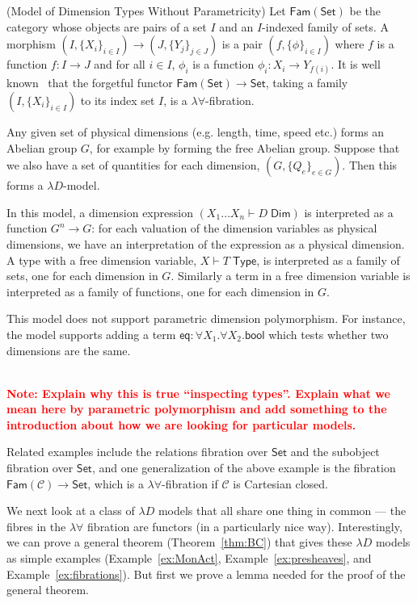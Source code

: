 \documentclass[a4paper,UKenglish]{lipics}
\newcommand\note[1]{{ \bf \textcolor{red} {\vspace{2mm}\; \\ Note: #1\\}}}
\newcommand{\msf}[1]{\mathsf{#1}} %
\newcommand{\Set}{\msf{Set}}
\newcommand{\Fam}[1]{\msf{Fam}(#1)}
\newcommand{\C}{\mathcal{C}}
\newcommand{\bool}{\msf{bool}}
\newcommand{\Tj}[2]{#1 \vdash #2 \; \msf{ Type}}
\newcommand{\Dj}[2]{#1 \vdash #2 \; \msf{ Dim}}
\newcommand{\Dim}{D}
\newcommand{\Dvar}{X}
\begin{document}
\begin{example}(Model of Dimension Types Without Parametricity)
\label{example:famset}
Let $\Fam\Set$ be the category whose objects are pairs of a set $I$ and an $I$-indexed family of sets. A morphism $(I,\{X_i\}_{i\in I})\to (J,\{Y_j\}_{j\in J})$ is a pair $(f,\{\phi\}_{i\in I})$ where $f$ is a function $f:I\to J$ and for all $i\in I$, $\phi_i$ is a function $\phi_i:X_i\to Y_{f(i)}$. It is well known~\cite{} that the forgetful functor $\Fam\Set\to \Set$, taking a family $(I,\{X_i\}_{i\in I})$ to its index set $I$, is a $\lambda\forall$-fibration.

Any given set of physical dimensions (e.g. length, time, speed etc.) forms an Abelian group $G$, for example by forming the free Abelian group. Suppose that we also have a set of quantities for each dimension, $(G,\{Q_e\}_{e\in G})$. Then this forms a $\lambda D$-model.

In this model, a dimension expression $(\Dj{\Dvar_1\dots \Dvar_n} \Dim)$ is interpreted as a function $G^n\to G$: for each valuation of the dimension variables as physical dimensions, we have an interpretation of the expression as a physical dimension. A type with a free dimension variable, $\Tj \Dvar T$, is interpreted as a family of sets, one for each dimension in $G$. Similarly a term in a free dimension variable is interpreted as a family of functions, one for each dimension in $G$.

This model does not support parametric dimension polymorphism. For instance, the model supports adding a term $\mathsf{eq}:\forall \Dvar_1.\forall \Dvar_2.\bool$ which tests whether two dimensions are the same.

\note{Explain why this is true ``inspecting types''. Explain what we mean here by parametric polymorphism and add something to the introduction about how we are looking for particular models.}
\end{example}

Related examples include the relations fibration over $\Set$ and the subobject fibration over $\Set$, and one generalization of the above example is the fibration $\Fam{\C}\to\Set$, which is a $\lambda\forall$-fibration if $\C$ is Cartesian closed.

We next look at a class of $\lambda D$ models that all share one thing in common --- the fibres in the $\lambda \forall$ fibration are functors (in a particularly nice way). Interestingly, we can prove a general theorem (Theorem~\ref{thm:BC}) that gives these $\lambda D$ models as simple examples (Example~\ref{ex:MonAct}, Example~\ref{ex:presheaves}, and Example~\ref{ex:fibrations}). But first we prove a lemma needed for the proof of the general theorem.
\end{document}
